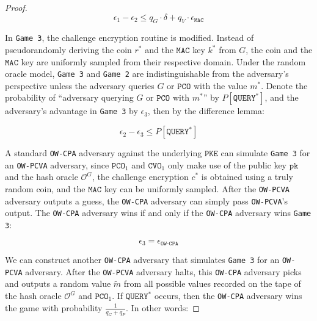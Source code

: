 \documentclass[floatrow,journal=tches,submission]{iacrtrans}
\newcommand{\monospace}{\texttt}
\newcommand{\pke}{\monospace{PKE}}
\newcommand{\mac}{\monospace{MAC}}
\newcommand{\pk}{\monospace{pk}}
\newcommand{\pco}{\monospace{PCO}}
\newcommand{\cvo}{\monospace{CVO}}
\begin{document}
\begin{proof}
    \begin{equation}\label{eq:ep1-ep2}
        \epsilon_1 - \epsilon_2 \leq q_G \cdot \delta + q_V \cdot \epsilon_\mac
    \end{equation}

    In \monospace{Game 3}, the challenge encryption routine is modified. Instead of pseudorandomly deriving the coin $r^\ast$ and the $\mac$ key $k^\ast$ from $G$, the coin and the $\mac$ key are uniformly sampled from their respective domain. Under the random oracle model, \monospace{Game 3} and \monospace{Game 2} are indistinguishable from the adversary's perspective unless the adversary queries $G$ or $\pco$ with the value $m^\ast$. Denote the probability of ``adversary querying $G$ or $\pco$ with $m^\ast$'' by $P[\monospace{QUERY}^\ast]$, and the adversary's advantage in \monospace{Game 3} by $\epsilon_3$, then by the difference lemma:

    \begin{equation}\label{eq:ep2-ep3}
        \epsilon_2 - \epsilon_3 \leq P[\monospace{QUERY}^\ast]
    \end{equation}

    A standard \monospace{OW-CPA} adversary against the underlying $\pke$ can simulate \monospace{Game 3} for an \monospace{OW-PCVA} adversary, since $\pco_1$ and $\cvo_1$ only make use of the public key $\pk$ and the hash oracle $\mathcal{O}^G$, the challenge encryption $c^\ast$ is obtained using a truly random coin, and the $\mac$ key can be uniformly sampled. After the \monospace{OW-PCVA} adversary outputs a guess, the \monospace{OW-CPA} adversary can simply pass \monospace{OW-PCVA}'s output. The \monospace{OW-CPA} adversary wins if and only if the \monospace{OW-CPA} adversary wins \monospace{Game 3}:

    \begin{equation}\label{eq:ep3-owcpa}
        \epsilon_3 = \epsilon_\monospace{OW-CPA}
    \end{equation}

    We can construct another \monospace{OW-CPA} adversary that simulates \monospace{Game 3} for an \monospace{OW-PCVA} adversary. After the \monospace{OW-PCVA} adversary halts, this \monospace{OW-CPA} adversary picks and outputs a random value $\tilde{m}$ from all possible values recorded on the tape of the hash oracle $\mathcal{O}^G$ and $\pco_1$. If $\monospace{QUERY}^\ast$ occurs, then the \monospace{OW-CPA} adversary wins the game with probability $\frac{1}{q_G + q_P}$. In other words:


\end{proof}
\end{document}

